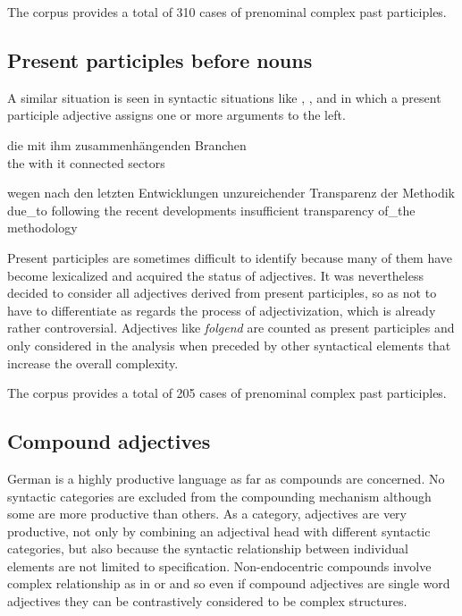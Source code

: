 \documentclass[output=paper,colorlinks,citecolor=brown]{langscibook}
\begin{document}
The corpus provides a total of 310 cases of prenominal complex past participles.

\subsection{ Present participles before nouns}\label{sec:4.1.2}

A similar situation is seen in syntactic situations like , , and  in which a present participle adjective assigns one or more arguments to the left.

\ea%
    \label{ex:resi:14}
\gll die  mit  ihm  zusammenhängenden  Branchen\\
  the  with  it  connected  sectors\\
\z

\ea%
    \label{ex:resi:15}
\gll wegen  nach  den  letzten  Entwicklungen  unzureichender   Transparenz  der  Methodik\\
    due\_to  following  the  recent  developments  insufficient  transparency   of\_the  methodology \\
\z


Present participles are sometimes difficult to identify because many of them have become lexicalized and acquired the status of adjectives. It was nevertheless decided to consider all adjectives derived from present participles, so as not to have to differentiate as regards the process of adjectivization, which is already rather controversial. Adjectives like \textit{folgend} are counted as present participles and only considered in the analysis when preceded by other syntactical elements that increase the overall complexity.

The corpus provides a total of 205 cases of prenominal complex past participles.

\subsection{Compound adjectives}\label{sec:4.2}

German is a highly productive language as far as compounds are concerned. No syntactic categories are excluded from the compounding mechanism although some are more productive than others. As a category, adjectives are very productive, not only by combining an adjectival head with different syntactic categories, but also because the syntactic relationship between individual elements are not limited to specification. Non-endocentric compounds involve complex relationship as in  or  and so even if compound adjectives are single word adjectives they can be contrastively considered to be complex structures.
\end{document}
